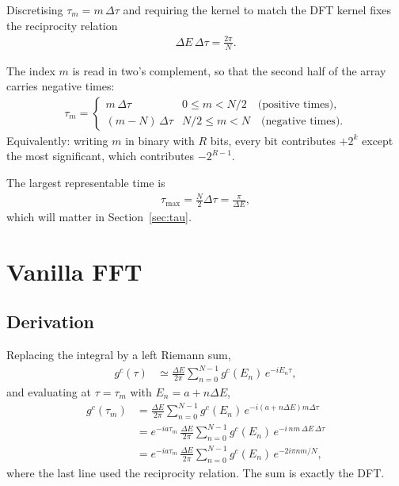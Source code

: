 \documentclass{article}
\begin{document}
	Discretising $\tau_m = m\,\Delta\tau$ and requiring the kernel to match the DFT
	kernel fixes the reciprocity relation
	\begin{align}
		\boxed{\;\Delta E\,\Delta\tau = \frac{2\pi}{N}.\;}
	\end{align}
	
	The index $m$ is read in two's complement, so that the second half of the array
	carries negative times:
	\begin{align}
		\tau_m = \begin{cases}
			m\,\Delta\tau       & 0 \le m < N/2 \quad \text{(positive times)},\\[2pt]
			(m-N)\,\Delta\tau   & N/2 \le m < N \quad \text{(negative times)}.
		\end{cases}
		\label{eq:twos}
	\end{align}
	Equivalently: writing $m$ in binary with $R$ bits, every bit contributes $+2^k$
	except the most significant, which contributes $-2^{R-1}$.
	
	The largest representable time is
	\begin{align}
		\tau_{\max} = \frac{N}{2}\Delta\tau = \frac{\pi}{\Delta E},
	\end{align}
	which will matter in Section~\ref{sec:tau}.
	
	\section{Vanilla FFT}
	
	\subsection{Derivation}
	
	Replacing the integral by a left Riemann sum,
	\begin{align}
		g^{c}(\tau) &\simeq \frac{\Delta E}{2\pi} \sum_{n=0}^{N-1} g^c(E_n)\,e^{-iE_n\tau},
	\end{align}
	and evaluating at $\tau = \tau_m$ with $E_n = a + n\Delta E$,
	\begin{align}
		g^{c}(\tau_m) &= \frac{\Delta E}{2\pi} \sum_{n=0}^{N-1} g^c(E_n)\,
		e^{-i(a + n\Delta E)m\Delta\tau} \\
		&= e^{-ia\tau_m}\,\frac{\Delta E}{2\pi} \sum_{n=0}^{N-1} g^c(E_n)\,
		e^{-i\,nm\,\Delta E\,\Delta\tau} \\
		&= e^{-ia\tau_m}\,\frac{\Delta E}{2\pi} \sum_{n=0}^{N-1} g^c(E_n)\,
		e^{-2i\pi nm/N},
		\label{eq:vanilla}
	\end{align}
	where the last line used the reciprocity relation. The sum is exactly the DFT\@.
	
\end{document}
